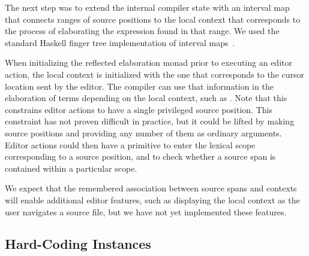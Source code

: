 The next step was to extend the internal compiler state with an
interval map that connects ranges of source positions to the local
context that corresponds to the process of elaborating the expression
found in that range. We used the standard Haskell finger tree
implementation of interval maps~\cite{fingertrees}.

When initializing the reflected elaboration monad prior to executing
an editor action, the local context is initialized with the one that
corresponds to the cursor location sent by the editor. The compiler
can use that information in the elaboration of terms depending on the
local context, such as . Note that this constrains
editor actions to have a single privileged source position. This
constraint has not proven difficult in practice, but it could be
lifted by making source positions  and providing any
number of them as ordinary arguments. Editor actions could then have a
primitive to enter the lexical scope corresponding to a source
position, and to check whether a source span is contained within a
particular scope.

We expect that the remembered association between source spans and
contexts will enable additional editor features, such as displaying
the local context as the user navigates a source file, but we have not
yet implemented these features.

\subsection{Hard-Coding \Editorable{} Instances}

